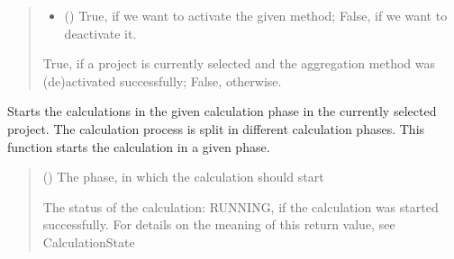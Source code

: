 \documentclass[letterpaper,10pt,english]{sphinxmanual}
\begin{document}
\begin{fulllineitems}
\begin{fulllineitems}
\begin{quote}
\begin{description}
\begin{itemize}
\item {} 
\sphinxAtStartPar
{} () \textendash{} True, if we want to activate the given method; False, if we want to deactivate it.

\end{itemize}

\sphinxAtStartPar
True, if a project is currently selected and the aggregation method was (de\sphinxhyphen{})activated successfully; False, otherwise.

\sphinxAtStartPar
{}

\end{description}\end{quote}

\end{fulllineitems}


\begin{fulllineitems}
\label{\detokenize{apidoc/src.osm_configurator.control:src.osm_configurator.control.control.Control.start_calculations}}
\pysigstartsignatures
{}
\pysigstopsignatures
\sphinxAtStartPar
Starts the calculations in the given calculation phase in the currently selected project.
The calculation process is split in different calculation phases. This function starts the calculation in a given phase.
\begin{quote}\begin{description}
\sphinxAtStartPar
{} ({\hyperref[\detokenize{apidoc/src.osm_configurator.model.project.calculation:src.osm_configurator.model.project.calculation.calculation_phase_enum.CalculationPhase}]{}}) \textendash{} The phase, in which the calculation should start

\sphinxAtStartPar
The status of the calculation: RUNNING, if the calculation was started successfully. For details on the meaning of this return value, see CalculationState


\end{description}
\end{quote}
\end{fulllineitems}
\end{fulllineitems}
\end{document}

